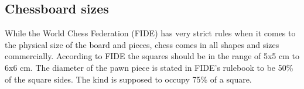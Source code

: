 \subsection{Chessboard sizes}
While the World Chess Federation (FIDE) has very strict rules \cite{FIDErules}when it comes to the physical size of the board and pieces, chess comes in all shapes and sizes commercially. According to FIDE the squares should be in the range of 5x5 cm to 6x6 cm. The diameter of the pawn piece is stated in FIDE's rulebook to be 50\% of the square sides. The kind is supposed to occupy 75\% of a square. 
\cite{roberti_francois}